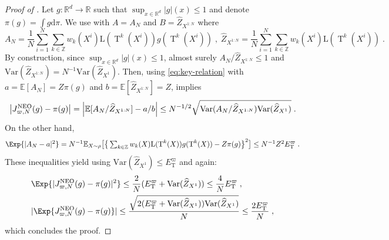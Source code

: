 \documentclass{article}
\def\IFIS{\ensuremath{\operatorname{NEO}}}
\def\NEO{{\small \IFIS}}
\def\transfo{\operatorname{T}}
\def\rmd{\operatorname{d}\hspace{-2pt}}
\def\PE{\mathbb{E}}
\def\rset{\mathbb{R}}
\def\rmd{\mathrm{d}}
\def\eqsp{\,}
\newcommand{\abs}[1]{\left\vert #1 \right\vert}
\def\eqsp{\;}
\newcommand{\1}{\mathds{1}}
\newcommand{\chunku}[3]{#1^{#2:#3}}
\def\const{Z}
\newcommand{\estConstC}[1]{\widehat{Z}_{#1}}
\def\rset{\mathbb{R}}
\def\zset{\mathbb{Z}}
\def\rmd{\mathrm{d}}
\def\likelihood{\mathrm{L}}
\def\infineSNIS{J^{\NEO}_{\varpi,N}}
\def\Var{\operatorname{Var}}
\def\txts{\textstyle}
\begin{document}
\begin{proof}[Proof of ]
  Let $g :\rset^d \to \rset$ such that  $\sup_{x \in \rset^d} \abs{g}(x) \leq 1$ and denote $\pi(g) = \int g \rmd \pi$.
We use  with $A = A_N$ and $B= \estConstC{\chunku{X}{1}{N}}$ where
\begin{equation}
    A_N = \frac{1}{N}\sum_{i=1}^N \sum_{k\in\zset}w_k(X^i) \likelihood(\transfo^k(X^i)) g(\transfo^k(X^i))\eqsp, \eqsp \estConstC{\chunku{X}{1}{N}} = \frac{1}{N}\sum_{i=1}^N \sum_{k\in\zset}w_k(X^i) \likelihood(\transfo^k(X^i))\eqsp.
\end{equation}
By construction, since  $\sup_{x \in \rset^d} \abs{g}(x) \leq 1$, almost surely $A_N/\estConstC{\chunku{X}{1}{N}} \leq 1$ and $\mathrm{Var}(\estConstC{\chunku{X}{1}{N}}) = N^{-1} \mathrm{Var}(\estConstC{X^1})$. Then, using  \eqref{eq:key-relation} with $a = \PE[A_N] = \const \pi(g)$ and $b = \PE[\estConstC{\chunku{X}{1}{N}}] = \const$,    implies  
\begin{equation}
  \left|\infineSNIS(g) - \pi(g)\right|=
    \left|\PE[A_N/\estConstC{\chunku{X}{1}{N}}] - a/b\right| \leq N^{-1/2}\sqrt{\Var(A_N/\estConstC{\chunku{X}{1}{N}}) \mathrm{Var}(\estConstC{X^1})}\eqsp.
\end{equation}
On the other hand,
\begin{equation*}
  \txts\Exp{|A_N - a|^2}  = N^{-1} \PE_{X \sim \rho}\big[\big\{\sum_{k \in \mathbb{Z}} w_k(X) \likelihood(\transfo^k(X))g(\transfo^k(X)) - \const \pi(g)\big\}^2 \big]
 \leq N^{-1} \const^2 E^{\varpi}_{\transfo}\eqsp.
\end{equation*}
These inequalities yield using $\mathrm{Var}(\estConstC{X^1}) \leq E^{\varpi}_{\transfo}$ and  again:
 \begin{align*}
     &\Exp{|\infineSNIS(g) - \pi(g)|^2} \leq \frac{2}{N}(E^{\varpi}_{\transfo} + \mathrm{Var}(\estConstC{X^1})) \leq\frac{4}{N}E^{\varpi}_{\transfo}\eqsp,\\
     &|\Exp{\infineSNIS(g) - \pi(g)}|\leq \frac{\sqrt{2(E^{\varpi}_{\transfo} + \mathrm{Var}(\estConstC{X^1}))\mathrm{Var}(\estConstC{X^1})}}{N}\leq \frac{2 E^{\varpi}_{\transfo}}{N}\eqsp,
 \end{align*}
 which concludes the proof.


\end{proof}
\end{document}
